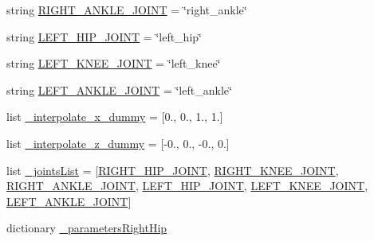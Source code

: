 \begin{DoxyCompactItemize}
\item 
string \mbox{\hyperlink{namespacepedal__simulation__interpolation_a0e0a198975d0424914f5e43f79488cb6}{R\+I\+G\+H\+T\+\_\+\+A\+N\+K\+L\+E\+\_\+\+J\+O\+I\+NT}} = \char`\"{}right\+\_\+ankle\char`\"{}
\item 
string \mbox{\hyperlink{namespacepedal__simulation__interpolation_abe72d1a8edf0a9f8a038b148bc3fc0ac}{L\+E\+F\+T\+\_\+\+H\+I\+P\+\_\+\+J\+O\+I\+NT}} = \char`\"{}left\+\_\+hip\char`\"{}
\item 
string \mbox{\hyperlink{namespacepedal__simulation__interpolation_a2e53d0d9efd1ff1a03e86cc61d2a67f2}{L\+E\+F\+T\+\_\+\+K\+N\+E\+E\+\_\+\+J\+O\+I\+NT}} = \char`\"{}left\+\_\+knee\char`\"{}
\item 
string \mbox{\hyperlink{namespacepedal__simulation__interpolation_afe0bf24935549d42d338d73b71f0d496}{L\+E\+F\+T\+\_\+\+A\+N\+K\+L\+E\+\_\+\+J\+O\+I\+NT}} = \char`\"{}left\+\_\+ankle\char`\"{}
\item 
list \mbox{\hyperlink{namespacepedal__simulation__interpolation_ae757f2eb597326f5eb864e4a9db7e5b7}{\+\_\+interpolate\+\_\+x\+\_\+dummy}} = \mbox{[}0., 0., 1., 1.\mbox{]}
\item 
list \mbox{\hyperlink{namespacepedal__simulation__interpolation_a7ef46256074b7569488c69898e137844}{\+\_\+interpolate\+\_\+z\+\_\+dummy}} = \mbox{[}-\/0., 0., -\/0., 0.\mbox{]}
\item 
list \mbox{\hyperlink{namespacepedal__simulation__interpolation_af1999ed031f9c71cb506aab0dc8e78d3}{\+\_\+joints\+List}} = \mbox{[}\mbox{\hyperlink{namespacepedal__simulation__interpolation_aad473b018fcc9d9c95a44581bd61660d}{R\+I\+G\+H\+T\+\_\+\+H\+I\+P\+\_\+\+J\+O\+I\+NT}}, \mbox{\hyperlink{namespacepedal__simulation__interpolation_a61524db0cb3c7fd23db26e1bbeaeef72}{R\+I\+G\+H\+T\+\_\+\+K\+N\+E\+E\+\_\+\+J\+O\+I\+NT}}, \mbox{\hyperlink{namespacepedal__simulation__interpolation_a0e0a198975d0424914f5e43f79488cb6}{R\+I\+G\+H\+T\+\_\+\+A\+N\+K\+L\+E\+\_\+\+J\+O\+I\+NT}}, \mbox{\hyperlink{namespacepedal__simulation__interpolation_abe72d1a8edf0a9f8a038b148bc3fc0ac}{L\+E\+F\+T\+\_\+\+H\+I\+P\+\_\+\+J\+O\+I\+NT}}, \mbox{\hyperlink{namespacepedal__simulation__interpolation_a2e53d0d9efd1ff1a03e86cc61d2a67f2}{L\+E\+F\+T\+\_\+\+K\+N\+E\+E\+\_\+\+J\+O\+I\+NT}}, \mbox{\hyperlink{namespacepedal__simulation__interpolation_afe0bf24935549d42d338d73b71f0d496}{L\+E\+F\+T\+\_\+\+A\+N\+K\+L\+E\+\_\+\+J\+O\+I\+NT}}\mbox{]}
\item 
dictionary \mbox{\hyperlink{namespacepedal__simulation__interpolation_adc0f53a9b2d7a8de99e3a71e63d8fd18}{\+\_\+parameters\+Right\+Hip}}

\end{DoxyCompactItemize}
